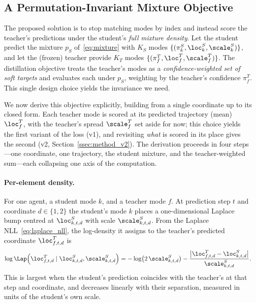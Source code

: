 \subsection{A Permutation-Invariant Mixture Objective}
\label{ssec:method_pi}
The proposed solution is to stop matching modes by index and instead score the
teacher's predictions under the student's \emph{full mixture density}. Let the
student predict the mixture $p_S$ of~\eqref{eq:mixture} with $K_S$ modes
$\{(\pi^S_k,\loc^S_k,\scale^S_k)\}$, and let the (frozen) teacher provide $K_T$
modes $\{(\pi^T_f,\loc^T_f,\scale^T_f)\}$. The distillation objective treats the
teacher's modes as a \emph{confidence-weighted set of soft targets} and evaluates
each under $p_S$, weighting by the teacher's confidence $\pi^T_f$. This single
design choice yields the invariance we need.

We now derive this objective explicitly, building from a single coordinate up to
its closed form. Each teacher mode is scored at its predicted trajectory (mean)
$\loc^T_f$, with the teacher's spread $\scale^T_f$ set aside for now; this choice
yields the first variant of the loss (v1), and revisiting \emph{what} is scored in
its place gives the second (v2, Section~\ref{ssec:method_v2}). The derivation
proceeds in four steps---one coordinate, one trajectory, the student mixture, and
the teacher-weighted sum---each collapsing one axis of the computation.

\paragraph{Per-element density.} For one agent, a student mode $k$, and a teacher
mode $f$. At prediction step $t$ and coordinate $d\in\{1,2\}$ the student's mode
$k$ places a one-dimensional Laplace bump centred at $\loc^S_{k,t,d}$ with scale
$\scale^S_{k,t,d}$. From the Laplace NLL~\eqref{eq:laplace_nll}, the log-density it
assigns to the teacher's predicted coordinate $\loc^T_{f,t,d}$ is
\begin{equation}
  \label{eq:per_elem}
  \log\Lap\!\left(\loc^T_{f,t,d}\mid \loc^S_{k,t,d},\scale^S_{k,t,d}\right)
    = -\log\!\big(2\,\scale^S_{k,t,d}\big)
      - \frac{\bigl\lvert \loc^T_{f,t,d}-\loc^S_{k,t,d}\bigr\rvert}{\scale^S_{k,t,d}}.
\end{equation}
This is largest when the student's prediction coincides with the teacher's at that
step and coordinate, and decreases linearly with their separation, measured in
units of the student's own scale.

